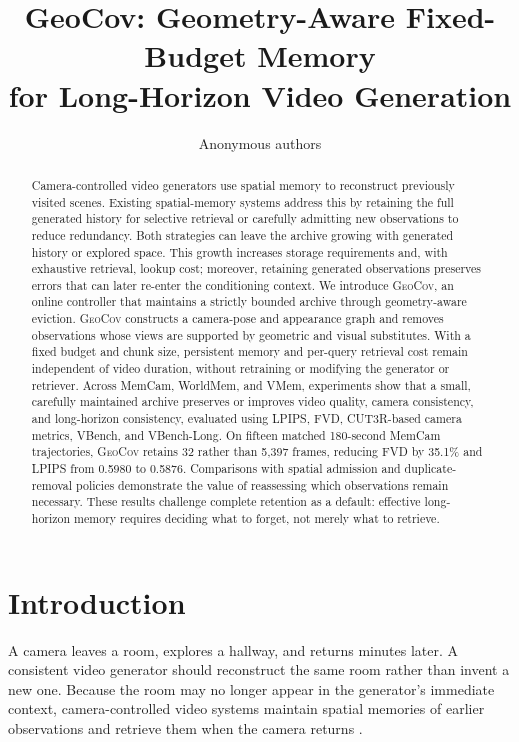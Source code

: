 \documentclass[10pt,twocolumn]{article}
\title{\textbf{GeoCov: Geometry-Aware Fixed-Budget Memory}\\
for Long-Horizon Video Generation}
\author{Anonymous authors}
\date{}
\newcommand{\Geo}{\textsc{GeoCov}\xspace}
\begin{document}
\maketitle

\begin{abstract}
Camera-controlled video generators use spatial memory to reconstruct previously
visited scenes. Existing spatial-memory systems address this by retaining the
full generated history for selective retrieval or carefully admitting new
observations to reduce redundancy. Both strategies can leave the archive
growing with generated history or explored space. This growth increases
storage requirements and, with exhaustive retrieval, lookup cost; moreover,
retaining generated observations preserves errors that can later re-enter the
conditioning context. We introduce \Geo, an online controller that maintains
a strictly bounded archive through geometry-aware eviction. \Geo constructs
a camera-pose and appearance graph and removes observations whose views are
supported by geometric and visual substitutes. With a fixed budget and chunk
size, persistent memory and per-query retrieval cost remain independent of
video duration, without retraining or modifying the generator or retriever.
Across MemCam, WorldMem, and VMem, experiments show that a small, carefully
maintained archive preserves or improves video quality, camera consistency,
and long-horizon consistency, evaluated using LPIPS, FVD, CUT3R-based camera
metrics, VBench, and VBench-Long. On fifteen matched 180-second MemCam
trajectories, \Geo retains 32 rather than 5,397 frames, reducing FVD by 35.1\%
and LPIPS from 0.5980 to 0.5876. Comparisons with spatial admission and
duplicate-removal policies demonstrate the value of reassessing which
observations remain necessary. These results challenge complete retention as
a default: effective long-horizon memory requires deciding what to forget,
not merely what to retrieve.
\end{abstract}

\section{Introduction}

A camera leaves a room, explores a hallway, and returns minutes later. A
consistent video generator should reconstruct the same room rather than invent
a new one. Because the room may no longer appear in the generator's immediate
context, camera-controlled video systems maintain spatial memories of earlier
observations and retrieve them when the camera returns
\citep{contextasmemory,memcam,worldmem,vmem}.
\end{document}
